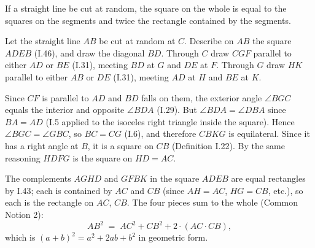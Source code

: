 \begin{claim}
\label{prop:II.4}
If a straight line be cut at random, the square on the whole is equal
to the squares on the segments and twice the rectangle contained by
the segments.
\end{claim}
\begin{evidence}[Proof of II.4]
\label{ev:II.4}

Let the straight line $AB$ be cut at random at $C$.  Describe on $AB$
the square $ADEB$ (I.46), and draw the diagonal $BD$.  Through $C$
draw $CGF$ parallel to either $AD$ or $BE$ (I.31), meeting $BD$ at
$G$ and $DE$ at $F$.  Through $G$ draw $HK$ parallel to either $AB$
or $DE$ (I.31), meeting $AD$ at $H$ and $BE$ at $K$.

Since $CF$ is parallel to $AD$ and $BD$ falls on them, the exterior
angle $\angle BGC$ equals the interior and opposite $\angle BDA$
(I.29).  But $\angle BDA = \angle DBA$ since $BA = AD$ (I.5 applied
to the isoceles right triangle inside the square).  Hence
$\angle BGC = \angle GBC$, so $BC = CG$ (I.6), and therefore $CBKG$
is equilateral.  Since it has a right angle at $B$, it is a square
on $CB$ (Definition I.22).  By the same reasoning $HDFG$ is the
square on $HD = AC$.

The complements $AGHD$ and $GFBK$ in the square $ADEB$ are equal
rectangles by I.43; each is contained by $AC$ and $CB$ (since
$AH = AC$, $HG = CB$, etc.), so each is the rectangle on $AC$, $CB$.
The four pieces sum to the whole (Common Notion 2):
\[
    AB^2 \;=\; AC^2 + CB^2 + 2\cdot(AC\cdot CB),
\]
which is $(a+b)^2 = a^2 + 2ab + b^2$ in geometric form.
\end{evidence}

